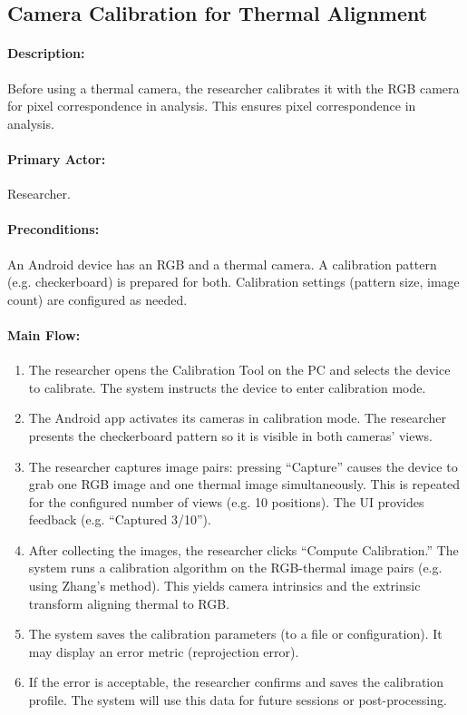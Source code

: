 \subsection{Camera Calibration for Thermal Alignment}

\paragraph{Description:} Before using a thermal camera, the researcher calibrates it with the RGB camera for pixel correspondence in analysis. This ensures pixel correspondence in analysis.

\paragraph{Primary Actor:} Researcher.

\paragraph{Preconditions:} An Android device has an RGB and a thermal camera. A calibration pattern (e.g. checkerboard) is prepared for both. Calibration settings (pattern size, image count) are configured as needed.

\paragraph{Main Flow:}
\begin{enumerate}
	\item The researcher opens the Calibration Tool on the PC and selects the device to calibrate. The system instructs the device to enter calibration mode.
	\item The Android app activates its cameras in calibration mode. The researcher presents the checkerboard pattern so it is visible in both cameras’ views.
	\item The researcher captures image pairs: pressing “Capture” causes the device to grab one RGB image and one thermal image simultaneously. This is repeated for the configured number of views (e.g. 10 positions). The UI provides feedback (e.g. “Captured 3/10”).
	\item After collecting the images, the researcher clicks “Compute Calibration.” The system runs a calibration algorithm on the RGB-thermal image pairs (e.g. using Zhang’s method). This yields camera intrinsics and the extrinsic transform aligning thermal to RGB.
	\item The system saves the calibration parameters (to a file or configuration). It may display an error metric (reprojection error).
	\item If the error is acceptable, the researcher confirms and saves the calibration profile. The system will use this data for future sessions or post-processing.
\end{enumerate}

